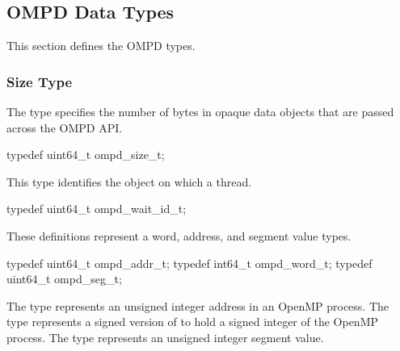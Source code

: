 
\subsection{OMPD Data Types}
\label{subsec:ompd-data-types}

This section defines the OMPD types.

\subsubsection{Size Type}
\label{subsubsubsec:ompd_size_t}

\summary
The  type specifies the number of bytes in opaque 
data objects that are passed across the OMPD API.

\format
\begin{ccppspecific}
\begin{ompSyntax}
typedef uint64_t ompd_size_t;
\end{ompSyntax}
\end{ccppspecific}



\label{subsubsubsec:ompd_wait_id_t}

This  type identifies the object on which a thread.

\format
\begin{ccppspecific}
\begin{ompSyntax}
typedef uint64_t ompd_wait_id_t;
\end{ompSyntax}
\end{ccppspecific}



\label{subsubsubsec:ompd_addr_t}
\label{subsubsubsec:ompd_word_t}
\label{subsubsubsec:ompd_seg_t}

These definitions represent a word, address, and segment value types.

\format

\begin{ccppspecific}
\begin{ompSyntax}
typedef uint64_t ompd_addr_t;
typedef int64_t  ompd_word_t;
typedef uint64_t ompd_seg_t;
\end{ompSyntax}
\end{ccppspecific}


The  type represents an unsigned integer address in an
OpenMP process.
The  type represents a signed version of   to hold a signed
integer of the OpenMP process.
The  type represents an unsigned integer segment value.


